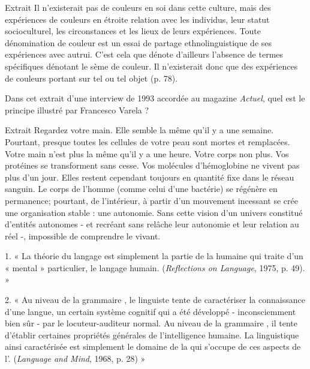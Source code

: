 \begin{lecture}{Extrait}
Il n’existerait pas de couleurs en soi dans cette culture, mais des expériences de couleurs en étroite relation avec les individus, leur statut socioculturel, les circonstances et les lieux de leurs expériences. Toute dénomination de couleur est un essai de partage ethnolinguistique de ses expériences avec autrui. C’est cela que dénote d’ailleurs l’absence de termes spécifiques dénotant le sème de couleur. Il n’existerait donc que des expériences de couleurs portant sur tel ou tel objet (p. 78).
\end{lecture}

Dans cet extrait d’une interview de 1993 accordée au magazine \emph{Actuel}, quel est le principe illustré par Francesco Varela ?
\begin{lecture}{Extrait}
Regardez votre main. Elle semble la même qu’il y a une semaine. Pourtant, presque toutes les cellules de votre peau sont mortes et remplacées. Votre main n’est plus la même qu’il y a une heure. Votre corps non plus. Vos protéines se transforment sans cesse. Vos molécules d’hémoglobine ne vivent pas plus d’un jour. Elles restent cependant toujours en quantité fixe dans le réseau sanguin. Le corps de l’homme (comme celui d’une bactérie) se régénère en permanence; pourtant, de l’intérieur, à partir d’un mouvement incessant se crée une organisation stable : une autonomie. Sans cette vision d’un univers constitué d’entités autonomes - et recréant sans relâche leur autonomie et leur relation au réel -, impossible de comprendre le vivant.
\end{lecture}
1. « La théorie du langage est simplement la partie de la \underline{\hspace{2.5cm}} humaine qui traite d’un « \underline{\hspace{2.5cm}} mental » particulier, le langage humain. (\emph{Reflections on Language}, 1975, p. 49). »

2. « Au niveau de la grammaire \underline{\hspace{2.2cm}}, le linguiste tente de caractériser la connaissance d’une langue, un certain système cognitif qui a été développé - inconsciemment bien sûr - par le locuteur-auditeur normal. Au niveau de la grammaire \underline{\hspace{2.2cm}}, il tente d’établir certaines propriétés générales de l’intelligence humaine. La linguistique ainsi caractérisée est simplement le domaine de la \underline{\hspace{2.2cm}} qui s’occupe de ces aspects de l’\underline{\hspace{2.2cm}}. (\emph{Language and Mind}, 1968, p. 28) »

